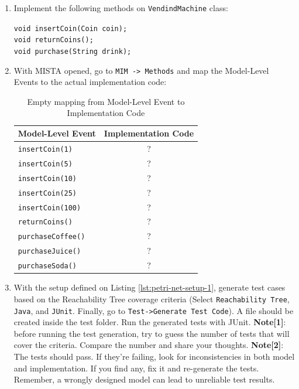 \documentclass[11pt]{article}
\begin{document}
\begin{enumerate}

\item Implement the following methods on \texttt{VendindMachine} class:

\texttt{void insertCoin(Coin coin);} \\ 
\texttt{void returnCoins();} \\
\texttt{void purchase(String drink);} \\

\item With MISTA opened, go to \texttt{MIM -> Methods} and map the Model-Level Events to the actual implementation code:

\begin{table}[!htb]
\centering
\begin{tabular}{|l|c|}
\hline
\textbf{Model-Level Event} & \textbf{Implementation Code}\\
\hline
\texttt{insertCoin(1)} & ?\\
\texttt{insertCoin(5)} & ?\\
\texttt{insertCoin(10)} & ?\\
\texttt{insertCoin(25)} & ?\\
\texttt{insertCoin(100)} & ?\\
\texttt{returnCoins()} & ?\\
\texttt{purchaseCoffee()} & ?\\
\texttt{purchaseJuice()} & ?\\
\texttt{purchaseSoda()} & ?\\
\hline
\end{tabular}
\caption{Empty mapping from Model-Level Event to Implementation Code}
\end{table}

\item With the setup defined on Listing \ref{lst:petri-net-setup-1}, generate test cases based on the Reachability Tree coverage criteria (Select \texttt{Reachability Tree}, \texttt{Java}, and \texttt{JUnit}. Finally, go to \texttt{Test->Generate Test Code}). A file should be created inside the test folder. Run the generated tests with JUnit. \textbf{Note[1]}: before running the test generation, try to guess the number of tests that will cover the criteria. Compare the number and share your thoughts. \textbf{Note[2]}: The tests should pass. If they're failing, look for inconsistencies in both model and implementation. If you find any, fix it and re-generate the tests. Remember, a wrongly designed model can lead to unreliable test results.


\end{enumerate}
\end{document}
